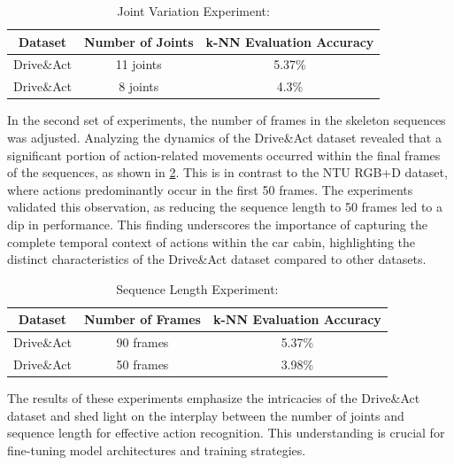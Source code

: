 \begin{table}[h]
\centering
\caption{Joint Variation Experiment:}
\label{tab:daa_experiment1}
\begin{tabular}{|c|c|c|}
\hline
\textbf{Dataset} & \textbf{Number of Joints} & \textbf{k-NN Evaluation Accuracy} \\
\hline
Drive\&Act & 11 joints & 5.37\% \\
\hline
Drive\&Act & 8 joints & 4.3\% \\
\hline
\end{tabular}
\end{table}

In the second set of experiments, the number of frames in the skeleton sequences was adjusted. Analyzing the dynamics of the Drive\&Act dataset revealed that a significant portion of action-related movements occurred within the final frames of the sequences, as shown in \ref{tab:daa_experiment2}. This is in contrast to the NTU RGB+D dataset, where actions predominantly occur in the first 50 frames. The experiments validated this observation, as reducing the sequence length to 50 frames led to a dip in performance. This finding underscores the importance of capturing the complete temporal context of actions within the car cabin, highlighting the distinct characteristics of the Drive\&Act dataset compared to other datasets. 

\begin{table}[h]
\centering
\caption{Sequence Length Experiment:}
\label{tab:daa_experiment2}
\begin{tabular}{|c|c|c|}
\hline
\textbf{Dataset} & \textbf{Number of Frames} & \textbf{k-NN Evaluation Accuracy} \\
\hline
Drive\&Act & 90 frames & 5.37\% \\
\hline
Drive\&Act & 50 frames & 3.98\% \\
\hline
\end{tabular}
\end{table}

The results of these experiments emphasize the intricacies of the Drive\&Act dataset and shed light on the interplay between the number of joints and sequence length for effective action recognition. This understanding is crucial for fine-tuning model architectures and training strategies.

